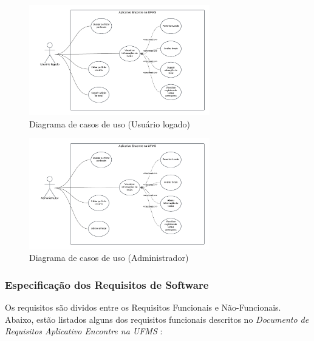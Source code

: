     \begin{figure}[h]
        \centering
        \includegraphics[width=0.7\textwidth]{imagens/usuarioLogado.png}
        \caption{\scriptsize Diagrama de casos de uso (Usuário logado)}
        \label{fig:casosDeUsoUsuarioLogado}
    \end{figure}

    \begin{figure}[h]
        \centering
        \includegraphics[width=0.7\textwidth]{imagens/administrador.png}
        \caption{\scriptsize Diagrama de casos de uso (Administrador)}
        \label{fig:casosDeUsoAdministrador}
    \end{figure}
    \FloatBarrier

\subsubsection{Especificação dos Requisitos de Software}

    Os requisitos são dividos entre os Requisitos Funcionais e Não-Funcionais. Abaixo, estão listados alguns dos requisitos funcionais descritos no \textit{Documento de Requisitos Aplicativo Encontre na UFMS} \cite{documentoRequisitosAplicativoEncontreNaUFMS}:
    
